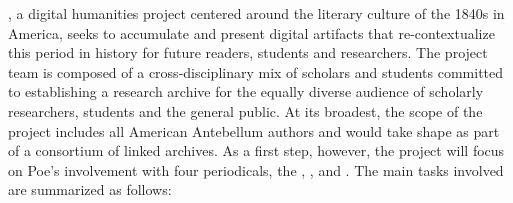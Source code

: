 \projectname, a digital humanities project centered around the literary culture of the 1840s in America, seeks to accumulate and present digital artifacts that re-contextualize this period in history for future readers, students and researchers. The project team is composed of a cross-disciplinary mix of scholars and students committed to establishing a research archive for the equally diverse audience of scholarly researchers, students and the general public. At its broadest, the scope of the project includes all American Antebellum authors and would take shape as part of a consortium of linked archives. As a first step, however, the project will focus on Poe's involvement with four periodicals, the \bwj, \slm, \bgm and \gm. The main tasks involved are summarized as follows: